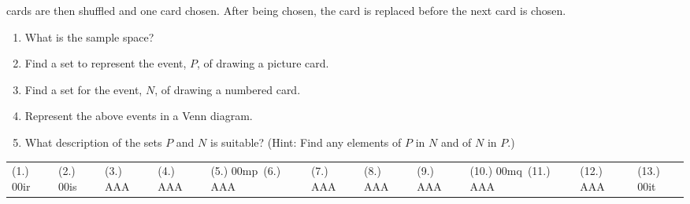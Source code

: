 \begin{eocexercises}{}
\begin{enumerate}[itemsep=5pt, label=\textbf{\arabic*}. ]
    cards are then shuffled and one card chosen. After being chosen,
    the card is replaced before the next card is chosen.
    \begin{enumerate}[noitemsep, label=\textbf{(\alph*)} ]
    \item What is the sample space?
    \item Find a set to represent the event, $P$, of drawing a picture
      card.
    \item Find a set for the event, $N$, of drawing a numbered card.
    \item Represent the above events in a Venn diagram.
    \item What description of the sets $P$ and $N$ is suitable?
      (Hint: Find any elements of $P$ in $N$ and of $N$ in $P$.)
    \end{enumerate}
  \end{enumerate}
\practiceinfo

  \begin{tabularx}{\textwidth}{XXXXX}
    (1.) 00ir& (2.) 00is& (3.) AAA& (4.) AAA& (5.) 00mp\
    (6.) AAA& (7.) AAA& (8.) AAA& (9.) AAA& (10.) 00mq\
    (11.) AAA& (12.) AAA& (13.) 00it\\
  \end{tabularx}
\end{eocexercises}
